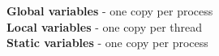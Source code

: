 \documentclass[number]{notes}
\begin{document}
\begin{landscape}
\begin{multicols}{3}
\textbf{Global variables} - one copy per process\\
\textbf{Local variables} - one copy per thread\\
\textbf{Static variables} - one copy per process

\end{multicols}
\end{landscape}
\end{document}
